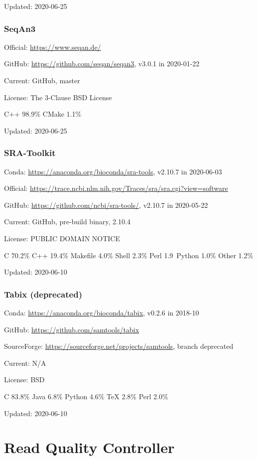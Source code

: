 \documentclass[]{article}
\begin{document}
Updated: 2020-06-25

\section{SeqAn3}

Official: \url{https://www.seqan.de/}

GitHub: \url{https://github.com/seqan/seqan3}, v3.0.1 in 2020-01-22

Current: GitHub, master

License: The 3-Clause BSD License

C++ 98.9\% CMake 1.1\%

Updated: 2020-06-25

\section{SRA-Toolkit}

Conda: \url{https://anaconda.org/bioconda/sra-tools}, v2.10.7 in 2020-06-03

Official: \url{https://trace.ncbi.nlm.nih.gov/Traces/sra/sra.cgi?view=software}

GitHub: \url{https://github.com/ncbi/sra-tools/}, v2.10.7 in 2020-05-22

Current: GitHub, pre-build binary, 2.10.4

License: PUBLIC DOMAIN NOTICE

C 70.2\% C++ 19.4\% Makefile 4.0\% Shell 2.3\% Perl 1.9\ Python 1.0\% Other 1.2\%

Updated: 2020-06-10

\section{Tabix (deprecated)}

Conda: \url{https://anaconda.org/bioconda/tabix}, v0.2.6 in 2018-10

GitHub: \url{https://github.com/samtools/tabix}

SourceForge: \url{https://sourceforge.net/projects/samtools}, branch deprecated

Current: N/A

License: BSD

C 83.8\% Java 6.8\% Python 4.6\% TeX 2.8\% Perl 2.0\%

Updated: 2020-06-10

\part{Read Quality Controller}
\end{document}
